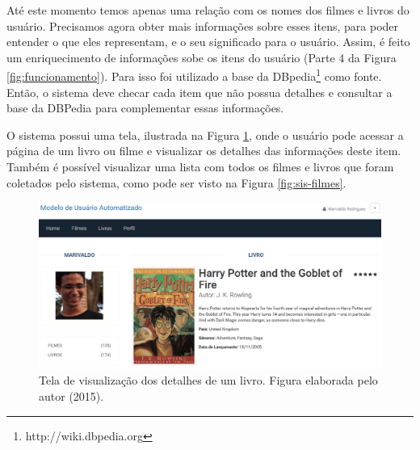 Até este momento temos apenas uma relação com os nomes dos filmes e livros do usuário. Precisamos agora obter mais informações sobre esses itens, para poder entender o que eles representam, e o seu significado para o usuário. Assim, é feito um enriquecimento de informações sobe os itens do usuário (Parte 4 da Figura \ref{fig:funcionamento}). Para isso foi utilizado a base da DBpedia\footnote{http://wiki.dbpedia.org} como fonte. Então, o sistema deve checar cada item que não possua detalhes e consultar a base da DBPedia para complementar essas informações.

O sistema possui uma tela, ilustrada na  Figura \ref{fig:sis-livro-detalhes}, onde o usuário pode acessar a página de um livro ou filme e visualizar os detalhes das informações deste item. Também é possível visualizar uma lista com todos os filmes e livros que foram coletados pelo sistema, como pode ser visto na Figura \ref{fig:sis-filmes}.


\begin{figure}[H]
	\centering
	\includegraphics[scale=0.5]{imagens/sistema/usuario-livro-detalhes.png}
	\caption{Tela de visualização dos detalhes de um livro. Figura elaborada pelo autor (2015).}
	\label{fig:sis-livro-detalhes}
\end{figure}


